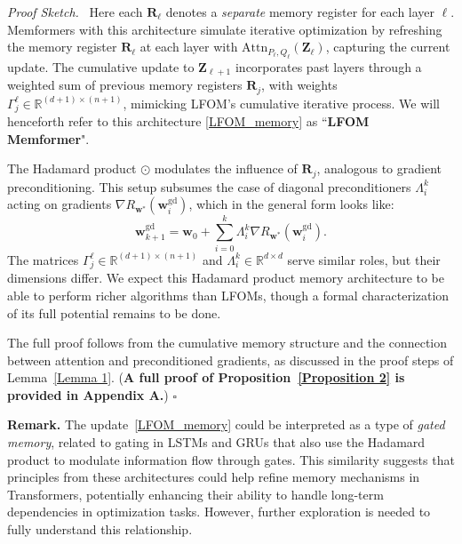 \documentclass[11pt]{article}
\numberwithin{equation}{section}
\newenvironment{proofsketch}{\par\noindent\textit{Proof Sketch.}\ }{\hfill$\square$\par}
\begin{document}
\begin{proofsketch}
Here each \( \mathbf{R}_\ell\) denotes a \textit{separate} memory register for each layer \(\ell\). Memformers with this architecture simulate iterative optimization by refreshing the memory register \( \mathbf{R}_\ell \) at each layer with \( \mathrm{Attn}_{P_\ell, Q_\ell}(\mathbf{Z}_\ell) \), capturing the current update. The cumulative update to \( \mathbf{Z}_{\ell+1} \) incorporates past layers through a weighted sum of previous memory registers \( \mathbf{R}_j \), with weights \( \Gamma_j^\ell \in \mathbb{R}^{(d + 1) \times (n + 1)} \), mimicking LFOM's cumulative iterative process. We will henceforth refer to this architecture \eqref{LFOM_memory} as ``\textbf{LFOM Memformer}".

The Hadamard product \( \odot \) modulates the influence of \( \mathbf{R}_j \), analogous to gradient preconditioning. This setup subsumes the case of diagonal preconditioners \( \Lambda_i^k \) acting on gradients \( \nabla R_{\mathbf{w}^*}(\mathbf{w}_i^{\mathrm{gd}}) \), which in the general form looks like:
\begin{equation}
\mathbf{w}_{k+1}^{\mathrm{gd}} = \mathbf{w}_0 + \sum_{i=0}^k \Lambda_i^k \nabla R_{\mathbf{w}^*}(\mathbf{w}_i^{\mathrm{gd}}).
\end{equation}
The matrices \( \Gamma_j^\ell \in \mathbb{R}^{(d + 1) \times (n + 1)} \) and \( \Lambda_i^k \in \mathbb{R}^{d \times d} \) serve similar roles, but their dimensions differ. We expect this Hadamard product memory architecture to be able to perform richer algorithms than LFOMs, though a formal characterization of its full potential remains to be done.

The full proof follows from the cumulative memory structure and the connection between attention and preconditioned gradients, as discussed in the proof steps of Lemma~\ref{Lemma 1}. (\textbf{A full proof of Proposition~\ref{Proposition 2} is provided in Appendix A.})
\end{proofsketch}

\textbf{Remark.} The update~\eqref{LFOM_memory} could be interpreted as a type of \emph{gated memory}, related to gating in LSTMs and GRUs that also use the Hadamard product to modulate information flow through gates. This similarity suggests that principles from these architectures could help refine memory mechanisms in Transformers, potentially enhancing their ability to handle long-term dependencies in optimization tasks. However, further exploration is needed to fully understand this relationship.
\end{document}
